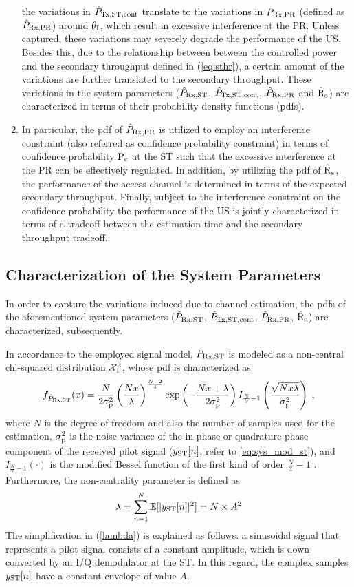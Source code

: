 \begin{enumerate}
the variations in $\hat{P}_{\text{Tx,ST,cont}}$ translate to the variations in $P_{\text{Rx,PR}}$ (defined as $\hat{P}_{\text{Rx,PR}}$) around $\theta_{\text{I}}$, which result in excessive interference at the PR. Unless captured, these variations may severely degrade the performance of the US. Besides this, due to the relationship between between the controlled power and the secondary throughput defined in (\ref{eq:sthr}), a certain amount of the variations are further translated to the secondary throughput. These variations in the system parameters ($\hat{P}_{\text{Rx,ST}}$, $\hat{P}_{\text{Tx,ST,cont}}$, $\hat{P}_{\text{Rx,PR}}$ and $\hat{\text{{R}}}_{\text{s}}$) are characterized in terms of their probability density functions (pdfs).  
	\item In particular, the pdf of $\hat{P}_{\text{Rx,PR}}$ is utilized to employ an interference constraint (also referred as confidence probability constraint) in terms of confidence probability $\text{P}_{\text{c}}$ at the ST such that the excessive interference at the PR can be effectively regulated. In addition, by utilizing the pdf of $\hat{\text{{R}}}_{\text{s}}$, the performance of the access channel is determined in terms of the expected secondary throughput. Finally, subject to the interference constraint on the confidence probability the performance of the US is jointly characterized in terms of a tradeoff between the estimation time and the secondary throughput tradeoff. 
\end{enumerate}

\subsection{Characterization of the System Parameters}
In order to capture the variations induced due to channel estimation, the pdfs of the aforementioned system parameters ($\hat{P}_{\text{Rx,ST}}$, $\hat{P}_{\text{Tx,ST,cont}}$, $\hat{P}_{\text{Rx,PR}}$, $\hat{\text{{R}}}_{\text{s}}$) are characterized, subsequently. 

In accordance to the employed signal model, $P_{\text{Rx,ST}}$ is modeled as a non-central chi-squared distribution $\ncchi2$, whose pdf is characterized as \cite{Char99}
\begin{equation}
	\label{nxc2equ}
	f_{\hat{P}_{\text{Rx,ST}}} (x) = 
	\frac{N}{2\sigma_\textrm{p}^2} \left(\frac{N x}{\lambda}\right)^\frac{N-2}{4}  
	\exp\left(-\frac{N x+\lambda}{2\sigma_\textrm{p}^2}\right)  I_{\frac{N}{2}-1}\left(\frac{\sqrt{N x\lambda}}{\sigma_\textrm{p}^2}\right) \;  ,
\end{equation}
where $N$ is the degree of freedom and also the number of samples used for the estimation, $\sigma^2_{\text{p}}$ is the noise variance of the in-phase or quadrature-phase component of the received pilot signal ($y_{\text{ST}}[n]$, refer to \ref{eq:sys_mod_st}), and $I_{\frac{N}{2}-1}(\cdot)$ is the modified Bessel function of the first kind of order $\frac{N}{2}-1$ \cite{Jef00}. Furthermore, the non-centrality parameter is defined as
\begin{equation}
	\label{lambda}
	\lambda = \sum_{n=1}^N \mathbb{E}[|y_{\text{ST}}[n]|^2] = N \times A^2
\end{equation}
The simplification in (\ref{lambda}) is explained as follows: a sinusoidal signal that represents a pilot signal consists of a constant amplitude, which is down-converted by an I/Q demodulator at the ST. In this regard, the complex samples $y_{\text{ST}}[n]$ have a constant envelope of value $A$. 

